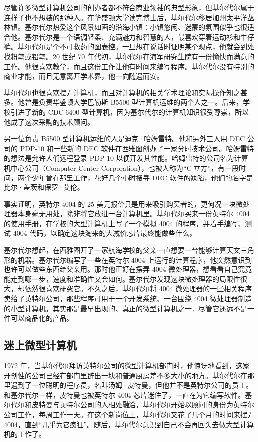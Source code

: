 \documentclass[12pt,UTF8]{ctexbook}
\begin{document}
尽管许多微型计算机公司的创办者都不符合商业领袖的典型形象，但基尔代尔属于连样子也不想装的那种人。在华盛顿大学读完博士后，基尔代尔移居加州太平洋丛林镇。基尔代尔热爱这个风景如画的沿海小镇：小镇悠闲、迷蒙的氛围似乎也很适合他。基尔代尔是一个语调轻柔、充满魅力和智慧的人，最喜欢穿着运动衫和牛仔裤。基尔代尔是个不可救药的图表控。一旦想在说话时证明某个观点，他就会到处找粉笔或铅笔。20 世纪 70 年代初，基尔代尔在海军研究生院有一份愉快而满意的工作。他很喜欢教学，而且这份工作让他有时间来编写程序。基尔代尔没有特别的商业才能，而且无意离开学术界，他一向随遇而安。

基尔代尔也很喜欢摆弄计算机，而且对计算机的相关学术理论和实际操作知之甚多。他曾是负责华盛顿大学巴勒斯 B5500 型计算机运维的两个人之一。后来，学校引进了新的 CDC 6400 型计算机，因为基尔代尔的计算机知识很受尊崇，所以他成了这次采购的技术顾问。

另一位负责 B5500 型计算机运维的人是迪克·哈姆雷特。他和另外三人用 DEC 公司的 PDP-10 和一些新的 DEC 软件在西雅图创办了一家分时技术公司。哈姆雷特的想法是允许人们远程登录 PDP-10 以便开发其性能。哈姆雷特的公司名为计算机中心公司（Computer Center Corporation），也被人称为“C 立方”，有一段时间，两个少年曾在那里工作，花好几个小时搜寻 DEC 软件的缺陷，他们的名字是比尔·盖茨和保罗·艾伦。

事实证明，英特尔 4004 的 25 美元报价只是用来吸引购买者的，更何况一块微处理器本身毫无用处，除非将它放进一台计算机里。基尔代尔买来一份英特尔 4004 的使用手册，在学校的大型计算机上写了一个模拟 4004 的程序，并着手编写、测试 4004 代码，以确定这块淘来的大减价芯片最终能做些什么。

基尔代尔想起，在西雅图开了一家航海学校的父亲一直想要一台能够计算天文三角形的机器。基尔代尔编写了一些在英特尔 4004 上运行的计算程序，他突然意识到也许可以做些东西给父亲用。那时他正好在摆弄 4004 微处理器，想看看自己究竟能走到哪一步，速度和准确性又会如何。基尔代尔发现这块微处理器的局限性很大，却依然很喜欢研究它。不久之后，基尔代尔将 4004 微处理器的一些相关程序卖给了英特尔公司，那些程序可用于一个开发系统、一台围绕 4004 微处理器制造的小型计算机，其实那是最早出现的、真正的微型计算机之一，尽管它还远不是一件可以商品化的产品。





\subsection{迷上微型计算机}


1972 年，当基尔代尔拜访英特尔公司的微型计算机部门时，他惊讶地看到，这家开创性的公司已经在部门里辟出一块和普通厨房差不多大小的地方。基尔代尔在那里遇到了一位聪明的程序员，名叫汤姆·皮特曼，但他并不是英特尔公司的员工。和基尔代尔一样，皮特曼也被英特尔 4004 芯片迷住了，一直在为它编写软件。基尔代尔和皮特曼与英特尔公司的人相处融洽，基尔代尔开始以顾问的身份为英特尔公司工作，每周工作一天。在这个新岗位上，基尔代尔又花了几个月的时间来摆弄 4004，直到“几乎为它疯狂”。随后，基尔代尔意识到自己不会再回头去做大型计算机的工作了。
\end{document}
